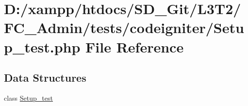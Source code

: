 \hypertarget{_admin_2tests_2codeigniter_2_setup__test_8php}{}\section{D\+:/xampp/htdocs/\+S\+D\+\_\+\+Git/\+L3\+T2/\+F\+C\+\_\+\+Admin/tests/codeigniter/\+Setup\+\_\+test.php File Reference}
\label{_admin_2tests_2codeigniter_2_setup__test_8php}
\subsection*{Data Structures}
\begin{DoxyCompactItemize}
\item 
class \hyperlink{class_setup__test}{Setup\+\_\+test}
\end{DoxyCompactItemize}
